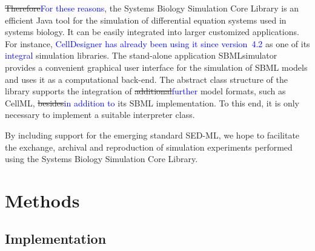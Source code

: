 \documentclass[10pt]{bmc_article}
\newenvironment{bmcformat}{\fussy\setboolean{publ}{true}}{\fussy}
\newcommand{\COR}[1]                      {\textcolor{blue}{#1}}
\begin{document}
\begin{bmcformat}
\sout{Therefore}\COR{For these reasons}, the Systems Biology Simulation Core Library is an efficient Java tool
for the simulation of differential equation systems used in systems biology.
It can be easily integrated into larger customized applications.
For instance, \COR{CellDesigner \cite{Funahashi2003} has already been using it since version~4.2}
as one of its \COR{integral} simulation libraries.
The stand-alone application SBMLsimulator \COR{\cite{SBMLsimulator2013}}
provides a convenient graphical user interface for the simulation of \acs{SBML}
models and uses it as a computational back-end.
The abstract class structure of the library supports the integration of \sout{additional}\COR{further} model formats,
such as CellML, \sout{besides}\COR{in addition to} its \acs{SBML} implementation.
To this end, it is only necessary to implement a suitable interpreter class.



By including support for the emerging standard \acs{SED-ML}, we hope to facilitate the
exchange, archival and reproduction of simulation experiments performed using
the Systems Biology Simulation Core Library.

\section*{Methods}

\subsection*{Implementation}


\end{bmcformat}
\end{document}
